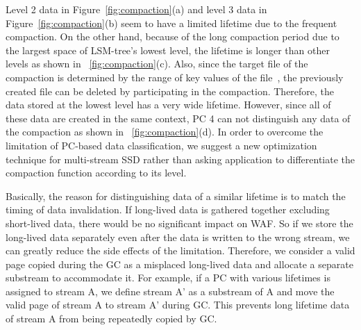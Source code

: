 Level 2 data in Figure~\ref{fig:compaction}(a) and level 3 data in
Figure~\ref{fig:compaction}(b) seem to have a limited lifetime due to the
frequent compaction.  On the other hand, because of the long compaction period
due to the largest space of LSM-tree's lowest level, the lifetime is longer
than other levels as shown in ~\ref{fig:compaction}(c).  Also, since the target
file of the compaction is determined by the range of key values of the
file~\cite{RocksDB}, the previously created file can be deleted by
participating in the compaction.  Therefore, the data stored at the lowest
level has a very wide lifetime.  However, since all of these data are created
in the same context, PC 4 can not distinguish any data of the compaction as
shown in ~\ref{fig:compaction}(d).  In order to overcome the limitation of
PC-based data classification, we suggest a new optimization technique for
multi-stream SSD rather than asking application to differentiate the compaction
function according to its level.

Basically, the reason for distinguishing data of a similar lifetime is to match
the timing of data invalidation.  If long-lived data is gathered together
excluding short-lived data, there would be no significant impact on WAF.  So if
we store the long-lived data separately even after the data is written to the
wrong stream, we can greatly reduce the side effects of the limitation.
Therefore, we consider a valid page copied during the GC as a misplaced
long-lived data and allocate a separate substream to accommodate it.  For
example, if a PC with various lifetimes is assigned to stream A, we define
stream A' as a substream of A and move the valid page of stream A to stream A'
during GC.  This prevents long lifetime data of stream A from being repeatedly
copied by GC.

